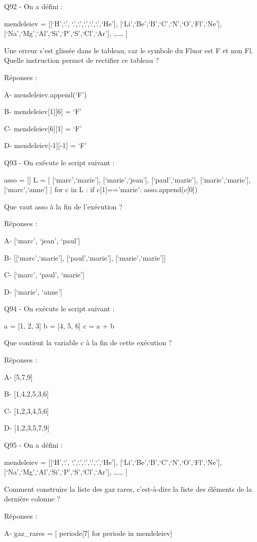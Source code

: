 \documentclass[
]{book}
\begin{document}
Q92 - On a défini :

mendeleiev = {[}{[}`H',`.', `.',`.',`.',`.',`.',`He'{]},
{[}`Li',`Be',`B',`C',`N',`O',`Fl',`Ne'{]},
{[}`Na',`Mg',`Al',`Si',`P',`S',`Cl',`Ar'{]},
\ldots\ldots{} {]}

Une erreur s'est glissée dans le tableau, car le symbole du Fluor est F et non Fl. Quelle instruction permet de rectifier ce tableau ?

Réponses :

A- mendeleiev.append(`F')

B- mendeleiev{[}1{]}{[}6{]} = `F'

C- mendeleiev{[}6{]}{[}1{]} = `F'

D- mendeleiev{[}-1{]}{[}-1{]} = `F'

Q93 - On exécute le script suivant :

asso = {[}{]}
L = {[} {[}`marc',`marie'{]}, {[}`marie',`jean'{]}, {[}`paul',`marie'{]}, {[}`marie',`marie'{]}, {[}`marc',`anne'{]} {]}
for c in L :
if c{[}1{]}=='marie':
asso.append(c{[}0{]})

Que vaut asso à la fin de l'exécution ?

Réponses :

A- {[}`marc', `jean', `paul'{]}

B- {[}{[}`marc',`marie'{]}, {[}`paul',`marie'{]}, {[}`marie',`marie'{]}{]}

C- {[}`marc', `paul', `marie'{]}

D- {[}`marie', `anne'{]}

Q94 - On exécute le script suivant :

a = {[}1, 2, 3{]}
b = {[}4, 5, 6{]}
c = a + b

Que contient la variable c à la fin de cette exécution ?

Réponses :

A- {[}5,7,9{]}

B- {[}1,4,2,5,3,6{]}

C- {[}1,2,3,4,5,6{]}

D- {[}1,2,3,5,7,9{]}

Q95 - On a défini :

mendeleiev = {[}{[}`H',`.', `.',`.',`.',`.',`.',`He'{]},
{[}`Li',`Be',`B',`C',`N',`O',`Fl',`Ne'{]},
{[}`Na',`Mg',`Al',`Si',`P',`S',`Cl',`Ar'{]},
\ldots\ldots{} {]}

Comment construire la liste des gaz rares, c'est-à-dire la liste des éléments de la dernière colonne ?

Réponses :

A- gaz\_rares = {[} periode{[}7{]} for periode in mendeleiev{]}
\end{document}

